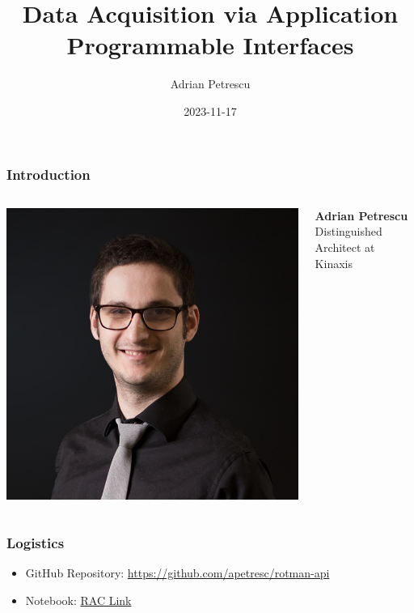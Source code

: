 \documentclass[dvipsnames]{beamer}
\title[Data Acquisition via APIs]{Data Acquisition via Application Programmable Interfaces}
\author{Adrian Petrescu}
\institute{Kinaxis}
\date{2023-11-17}
\begin{document}
\frame{\titlepage}


\begin{frame}
  \frametitle{Introduction}

  \begin{columns}

    \includegraphics{img/speaker-headshot.png}

    \textbf{Adrian Petrescu} \\
    Distinguished Architect at Kinaxis
  \end{columns}
\end{frame}

\begin{frame}
  \frametitle{Logistics}
  
  \begin{itemize}
    \item GitHub Repository: \href{https://github.com/apetresc/rotman-api}{https://github.com/apetresc/rotman-api}
    \item Notebook: \href{https://rac.rotman.utoronto.ca/jupyter/user/ut_apetrescu/lab/tree/Day1.ipynb}{RAC Link}
  \end{itemize}
\end{frame}
\end{document}
